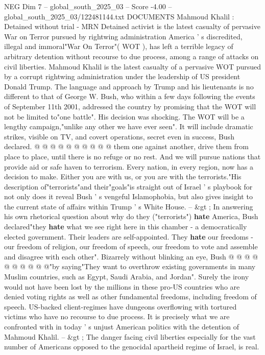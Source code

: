 \begin{textsample}{NEG Dim 7 – global\_south\_2025\_03 – Score -4.00 – global\_south\_2025\_03/122481144.txt}  \label{ex:f7_neg_359}
DOCUMENTS Mahmoud Khalil : Detained without trial - MRN Detained activist is the latest casualty of pervasive War on Terror pursued by rightwing administration America ' s discredited, illegal and immoral"War On Terror"( WOT ), has left a terrible legacy of arbitrary detention without recourse to due process, among a range of attacks on civil liberties.
Mahmoud Khalil is the latest casualty of a pervasive WOT pursued by a corrupt rightwing administration under the leadership of US president Donald Trump.
The language and approach by Trump and his lieutenants is no different to that of George W.
Bush, who within a few days following the events of September 11th 2001, addressed the country by promising that the WOT will not be limited to"one battle".
His decision was shocking.
The WOT will be a lengthy campaign,"unlike any other we have ever seen".
It will include dramatic strikes, visible on TV, and covert operations, secret even in success, Bush declared. @ @ @ @ @ @ @ @ @ @ them one against another, drive them from place to place, until there is no refuge or no rest.
And we will pursue nations that provide aid or safe haven to terrorism.
Every nation, in every region, now has a decision to make.
Either you are with us, or you are with the terrorists."His description of"terrorists"and their"goals"is straight out of Israel ' s playbook for not only does it reveal Bush ' s vengeful Islamophobia, but also gives insight to the current state of affairs within Trump ' s White House. -- \&gt ; In answering his own rhetorical question about why do they ("terrorists") \textbf{hate} America, Bush declared"they \textbf{hate} what we see right here in this chamber - a democratically elected government.
Their leaders are self-appointed.
They \textbf{hate} our freedoms - our freedom of religion, our freedom of speech, our freedom to vote and assemble and disagree with each other".
Bizarrely without blinking an eye, Bush @ @ @ @ @ @ @ @ @ @"by saying"They want to overthrow existing governments in many Muslim countries, such as Egypt, Saudi Arabia, and Jordan".
Surely the irony would not have been lost by the millions in these pro-US countries who are denied voting rights as well as other fundamental freedoms, including freedom of speech.
US-backed client-regimes have dungeons overflowing with tortured victims who have no recourse to due process.
It is precisely what we are confronted with in today ' s unjust American politics with the detention of Mahmoud Khalil. -- \&gt ; The danger facing civil liberties especially for the vast number of Americans opposed to the genocidal apartheid regime of Israel, is real.

\end{textsample}
